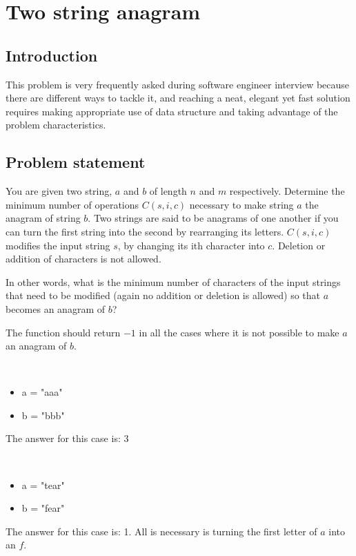 %


\chapter{Two string anagram}
\label{ch:two_string_anagram}
\section*{Introduction}
This problem is very frequently asked during software engineer  interview because there are different ways to tackle it, and reaching a neat, elegant yet fast solution requires making appropriate use of data structure and taking advantage of the problem characteristics.

\section{Problem statement}
You are given two string, $a$ and $b$ of length $n$ and $m$ respectively.  Determine the minimum number of operations $C(s, i, c)$ necessary to make string $a$ the anagram of string $b$. Two strings are said to be anagrams of one another if you can turn the first string into
the second by rearranging its letters.
$C(s,i,c)$ modifies the input string $s$, by changing its ith character into $c$. Deletion or addition of characters is not allowed.

In other words, what is the minimum number of  characters of the input strings that need to be modified (again no addition or deletion is allowed)  so that $a$ becomes an anagram of $b$?

The function should return $-1$ in all the cases where it is not possible to make $a$ an anagram of $b$.

\begin{example}
	\hfill \\
	\begin{itemize}
		\item[] 	a = "aaa"
		\item[] 	b = "bbb"
	\end{itemize}
	 The answer for this case is: 3

\end{example}

\begin{example}
	\hfill \\
	\begin{itemize}
		\item[] 	a = "tear"
		\item[] 	b = "fear"
	\end{itemize}
	 The answer for this case is: 1. All is necessary is turning the first letter of $a$ into an $f$.

\end{example}

